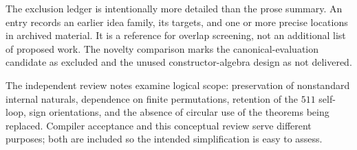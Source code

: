 \documentclass[11pt,letterpaper]{article}
\begin{document}
The exclusion ledger is intentionally more detailed than the prose summary.
An entry records an earlier idea family, its targets, and one or more precise
locations in archived material. It is a reference for overlap screening, not
an additional list of proposed work. The novelty comparison marks the
canonical-evaluation candidate as excluded and the unused constructor-algebra
design as not delivered.

The independent review notes examine logical scope: preservation of
nonstandard internal naturals, dependence on finite permutations, retention of
the $511$ self-loop, sign orientations, and the absence of circular use of the
theorems being replaced. Compiler acceptance and this conceptual review serve
different purposes; both are included so the intended simplification is easy
to assess.
\end{document}
